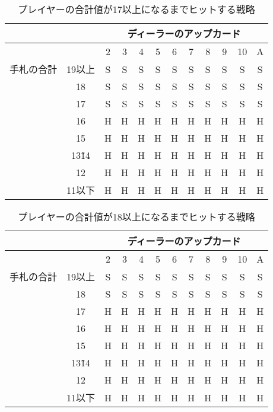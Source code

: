 \begin{table}[p]
  \centering
  \caption{プレイヤーの合計値が17以上になるまでヒットする戦略\label{hitleq17}}
  \begin{tabular}{|c|c|c|c|c|c|c|c|c|c|c|c|}
    \hline
    \multicolumn{2}{|c|}{} & \multicolumn{10}{|c|}{ディーラーのアップカード} \\ \hline
    \multicolumn{2}{|c|}{} & 2 & 3 & 4 & 5 & 6 & 7 & 8 & 9 & 10 & A \\ \hline
    手札の合計 & 19以上 & S & S & S & S & S & S & S & S & S & S \\ \cline{3-12}
              & 18 & S & S & S & S & S & S & S & S & S & S \\ \cline{3-12}
              & 17 & S & S & S & S & S & S & S & S & S & S \\ \cline{3-12}
              & 16 & H & H & H & H & H & H & H & H & H & H \\ \cline{3-12}
              & 15 & H & H & H & H & H & H & H & H & H & H \\ \cline{3-12}
              & 13\~ 14 & H & H & H & H & H & H & H & H & H & H \\ \cline{3-12}
              & 12 & H & H & H & H & H & H & H & H & H & H \\ \cline{3-12}
              & 11以下 & H & H & H & H & H & H & H & H & H & H \\ \hline
  \end{tabular}
\end{table}

\begin{table}[p]
  \centering
  \caption{プレイヤーの合計値が18以上になるまでヒットする戦略\label{hitleq18}}
  \begin{tabular}{|c|c|c|c|c|c|c|c|c|c|c|c|}
    \hline
    \multicolumn{2}{|c|}{} & \multicolumn{10}{|c|}{ディーラーのアップカード} \\ \hline
    \multicolumn{2}{|c|}{} & 2 & 3 & 4 & 5 & 6 & 7 & 8 & 9 & 10 & A \\ \hline
    手札の合計 & 19以上 & S & S & S & S & S & S & S & S & S & S \\ \cline{3-12}
              & 18 & S & S & S & S & S & S & S & S & S & S \\ \cline{3-12}
              & 17 & H & H & H & H & H & H & H & H & H & H \\ \cline{3-12}
              & 16 & H & H & H & H & H & H & H & H & H & H \\ \cline{3-12}
              & 15 & H & H & H & H & H & H & H & H & H & H \\ \cline{3-12}
              & 13\~ 14 & H & H & H & H & H & H & H & H & H & H \\ \cline{3-12}
              & 12 & H & H & H & H & H & H & H & H & H & H \\ \cline{3-12}
              & 11以下 & H & H & H & H & H & H & H & H & H & H \\ \hline
  \end{tabular}
\end{table}
\newpage

